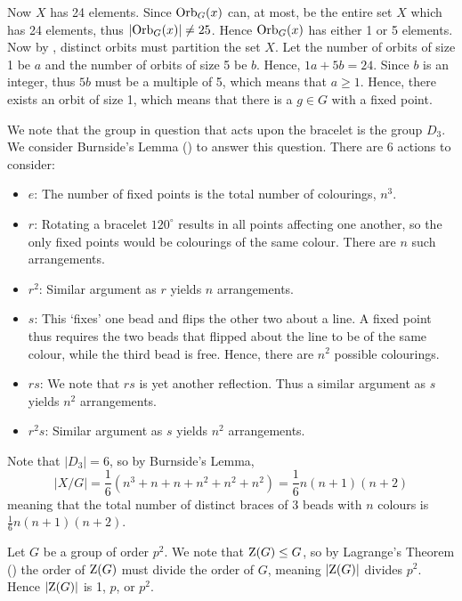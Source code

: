 \begin{questions}
    Now $X$ has 24 elements. Since $\mathrm{Orb}_{G}(x)$ can, at most, be the entire set $X$ which has 24 elements, thus $|\mathrm{Orb}_{G}(x)| \neq 25$. Hence $\mathrm{Orb}_{G}(x)$ has either 1 or 5 elements. Now by , distinct orbits must partition the set $X$. Let the number of orbits of size 1 be $a$ and the number of orbits of size 5 be $b$. Hence, $1a + 5b = 24$. Since $b$ is an integer, thus $5b$ must be a multiple of 5, which means that $a \geq 1$. Hence, there exists an orbit of size 1, which means that there is a $g \in G$ with a fixed point.

    \item We note that the group in question that acts upon the bracelet is the group $D_3$. We consider Burnside's Lemma () to answer this question. There are 6 actions to consider:
    \begin{itemize}
        \item $\boxed{e}$: The number of fixed points is the total number of colourings, $n^3$.
        \item $\boxed{r}$: Rotating a bracelet $120^\circ$ results in all points affecting one another, so the only fixed points would be colourings of the same colour. There are $n$ such arrangements.
        \item $\boxed{r^2}$: Similar argument as $r$ yields $n$ arrangements.
        \item $\boxed{s}$: This `fixes' one bead and flips the other two about a line. A fixed point thus requires the two beads that flipped about the line to be of the same colour, while the third bead is free. Hence, there are $n^2$ possible colourings.
        \item $\boxed{rs}$: We note that $rs$ is yet another reflection. Thus a similar argument as $s$ yields $n^2$ arrangements.
        \item $\boxed{r^2s}$: Similar argument as $s$ yields $n^2$ arrangements.
    \end{itemize}
    Note that $|D_3| = 6$, so by Burnside's Lemma,
    \[
        |X/G| = \frac16\left(n^3 + n + n + n^2 + n^2 + n^2\right) = \frac16 n(n+1)(n+2)
    \]
    meaning that the total number of distinct braces of 3 beads with $n$ colours is $\frac16 n(n+1)(n+2)$.

    \item Let $G$ be a group of order $p^2$. We note that $\mathrm{Z}(G) \leq G$, so by Lagrange's Theorem () the order of $\mathrm{Z}(G)$ must divide the order of $G$, meaning $|\mathrm{Z}(G)|$ divides $p^2$. Hence $|\mathrm{Z}(G)|$ is 1, $p$, or $p^2$.


\end{questions}
